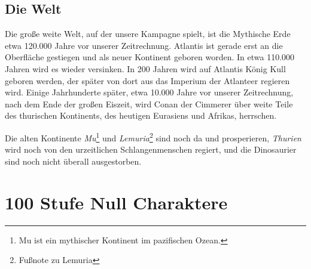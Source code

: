 \documentclass[11pt]{wbzine}
\begin{document}
\begin{multicols}{2}
\section{Die Welt}

Die große weite Welt, auf der unsere Kampagne spielt, ist die Mythische Erde
etwa 120.000 Jahre vor unserer Zeitrechnung. Atlantis ist gerade erst an die
Oberfläche gestiegen und als neuer Kontinent geboren worden. In etwa 110.000
Jahren wird es wieder versinken.  In 200 Jahren wird auf Atlantis König Kull
geboren werden, der später von dort aus das Imperium der Atlanteer regieren
wird.  Einige Jahrhunderte später, etwa 10.000 Jahre vor unserer Zeitrechnung,
nach dem Ende der großen Eiszeit, wird Conan der Cimmerer über weite Teile des
thurischen Kontinents, des heutigen Eurasiens und Afrikas, herrschen.

Die alten Kontinente \textit{Mu}\footnote{Mu ist ein mythischer Kontinent im
pazifischen Ozean.} und \textit{Lemuria}\footnote{Fußnote zu Lemuria} sind noch
da und prosperieren, \textit{Thurien} wird noch von den urzeitlichen
Schlangenmenschen regiert, und die Dinosaurier sind noch nicht überall
ausgestorben.


\end{multicols}

\section{100 Stufe Null Charaktere}
\label{100char}
\end{document}
